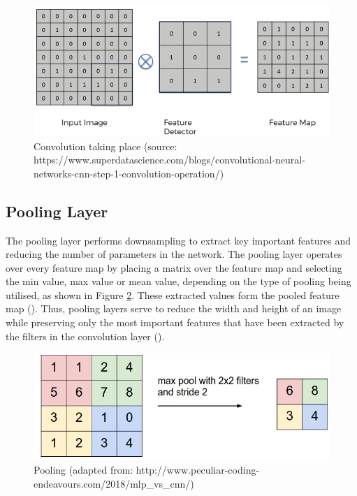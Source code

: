 \documentclass[12pt]{report}
\begin{document}
\vspace{0.5cm}
\begin{figure}[ht!]
	\centering
	\includegraphics[width=12cm]{conv}
	\caption{Convolution taking place (source: https://www.superdatascience.com/blogs/convolutional-neural-networks-cnn-step-1-convolution-operation/)}
	\label{fig:conv}
\end{figure}

\newpage
\subsection{Pooling Layer}
\begin{flushleft}
The pooling layer performs downsampling to extract key important features and reducing the number of parameters in the network. The pooling layer operates over every feature map by placing a matrix over the feature map and selecting the min value, max value or mean value, depending on the type of pooling being utilised, as shown in Figure \ref{fig:pool}. These extracted values form the pooled feature map (\cite{o2015introduction}). Thus, pooling layers serve to reduce the width and height of an image while preserving only the most important features that have been extracted by the filters in the convolution layer (\cite{zhao2019object}).
\end{flushleft}

\vspace{0.5cm}
\begin{figure}[ht!]
	\centering
	\includegraphics[width=12cm]{pool}
	\caption{Pooling (adapted from: http://www.peculiar-coding-endeavours.com/2018/mlp\_vs\_cnn/)}
	\label{fig:pool}
\end{figure}
\end{document}
